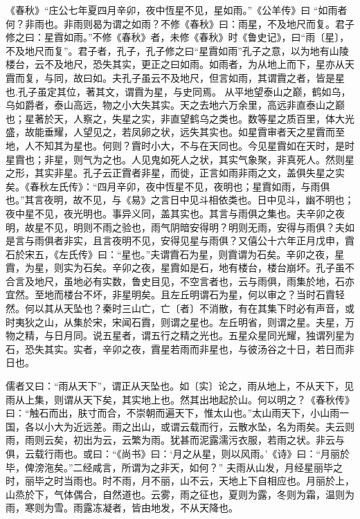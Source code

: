 \documentclass[]{article}
\begin{document}
《春秋》``庄公七年夏四月辛卯，夜中恆星不见，星如雨。''《公羊传》曰
``如雨者何？非雨也。非雨则曷为谓之如雨？不修《春秋》曰：雨星，不及地尺而复。君子修之曰：星霣如雨。''不修《春秋》者，未修《春秋》时《鲁史记》，曰``雨〔星〕，不及地尺而复''。君子者，孔子，孔子修之曰``星霣如雨''孔子之意，以为地有山陵楼台，云不及地尺，恐失其实，更正之曰如雨。如雨者，为从地上而下，星亦从天霣而复，与同，故曰如。夫孔子虽云不及地尺，但言如雨，其谓霣之者，皆是星也.孔子虽定其位，著其文，谓霣为星，与史同焉。
从平地望泰山之巅，鹤如乌，乌如爵者，泰山高远，物之小大失其实。天之去地六万余里，高远非直泰山之巅也；星著於天，人察之，失星之实，非直望鹤乌之类也。数等星之质百里，体大光盛，故能垂耀，人望见之，若凤卵之状，远失其实也。如星霣审者天之星霣而至地，人不知其为星也。何则？霣时小大，不与在天同也。今见星霣如在天时，是时星霣也；非星，则气为之也。人见鬼如死人之状，其实气象聚，非真死人。然则星之形，其实非星。孔子云正霣者非星，而徙，正言如雨非雨之文，盖俱失星之实矣。《春秋左氏传》：``四月辛卯，夜中恆星不见，夜明也；星霣如雨，与雨俱也。''其言夜明，故不见，与《易》之言日中见斗相依类也。日中见斗，幽不明也；夜中星不见，夜光明也。事异义同，盖其实也。其言与雨俱之集也。夫辛卯之夜明，故星不见，明则不雨之验也，雨气阴暗安得明？明则无雨，安得与雨俱？夫如是言与雨俱者非实，且言夜明不见，安得见星与雨俱？又僖公十六年正月戊申，霣石於宋五，《左氏传》曰：``星也。''夫谓霣石为星，则霣谓为石矣。辛卯之夜，星霣，为星，则实为石矣。辛卯之夜，星霣如是石，地有楼台，楼台崩坏。孔子虽不合言及地尺，虽地必有实数，鲁史目见，不空言者也，云与雨俱，雨集於地，石亦宜然。至地而楼台不坏，非星明矣。且左丘明谓石为星，何以审之？当时石霣轻然。何以其从天坠也？秦时三山亡，亡〔者〕不消散，有在其集下时必有声音，或时夷狄之山，从集於宋，宋闻石霣，则谓之星也。左丘明省，则谓之星。夫星，万物之精，与日月同。说五星者，谓五行之精之光也。五星众星同光耀，独谓列星为石，恐失其实。实者，辛卯之夜，霣星若雨而非星也，与彼汤谷之十日，若日而非日也。

儒者又曰：``雨从天下''，谓正从天坠也。如〔实〕论之，雨从地上，不从天下，见雨从上集，则谓从天下矣，其实地上也。然其出地起於山。何以明之？《春秋传》曰：``触石而出，肤寸而合，不崇朝而遍天下，惟太山也。''太山雨天下，小山雨一国，各以小大为近远差。雨之出山，或谓云载而行，云散水坠，名为雨矣。夫云则雨，雨则云矣，初出为云，云繁为雨。犹甚而泥露濡污衣服，若雨之状。非云与俱，云载行雨也。或曰：``《尚书》曰：`月之从星，则以风雨。'《诗》曰：``月丽於毕，俾滂沲矣。''二经咸言，所谓为之非天，如何？''
夫雨从山发，月经星丽毕之时，丽毕之时当雨也。时不雨，月不丽，山不云，天地上下自相应也。月丽於上，山烝於下，气体偶合，自然道也。云雾，雨之征也，夏则为露，冬则为霜，温则为雨，寒则为雪。雨露冻凝者，皆由地发，不从天降也。
\end{document}
